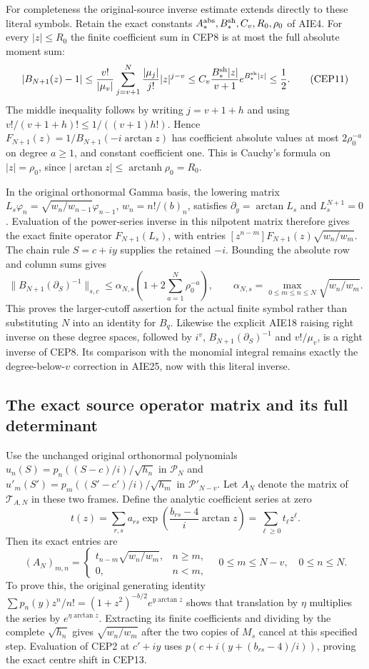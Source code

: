 \documentclass[11pt,a4paper]{article}
\begin{document}
For completeness the original-source inverse estimate extends
directly to these literal symbols. Retain the exact constants
$A_*^{\rm abs},B_*^{\rm sh},C_v,R_0,\rho_0$ of AIE4.
For every $|z|\le R_0$ the finite coefficient sum in CEP8 is at most
the full absolute moment sum:
\[
 |B_{N+1}(z)-1|
 \le \frac{v!}{|\mu_v|}
          \sum_{j=v+1}^N\frac{|\mu_j|}{j!}|z|^{j-v}
 \le C_v\frac{B_*^{\rm sh}|z|}{v+1}e^{B_*^{\rm sh}|z|}
 \le\frac12.
 \tag{CEP11}
\]
The middle inequality follows by writing $j=v+1+h$ and using
$v!/(v+1+h)!\le1/((v+1)h!)$. Hence
$F_{N+1}(z)=1/B_{N+1}(-i\arctan z)$ has coefficient absolute
values at most $2\rho_0^{-a}$ on degree $a\ge1$, and constant
coefficient one. This is Cauchy's formula on $|z|=\rho_0$, since
$|\arctan z|\le\operatorname{arctanh}\rho_0=R_0$.

In the original orthonormal Gamma basis, the lowering matrix
$L_s\varphi_n=\sqrt{w_n/w_{n-1}}\varphi_{n-1}$,
$w_n=n!/(b)_n$, satisfies
$\partial_y=\arctan L_s$ and $L_s^{N+1}=0$.
Evaluation of the power-series inverse in this nilpotent matrix
therefore gives the exact finite operator
$F_{N+1}(L_s)$, with entries
$[z^{n-m}]F_{N+1}(z)\sqrt{w_n/w_m}$.
The chain rule $S=c+iy$ supplies the retained $-i$.
Bounding the absolute row and column sums gives
\[
 \|B_{N+1}(\partial_S)^{-1}\|_{s,c}
 \le \alpha_{N,s}\left(1+2\sum_{a=1}^N\rho_0^{-a}\right),
 \qquad
 \alpha_{N,s}=\max_{0\le m\le n\le N}\sqrt{w_n/w_m}.
 \tag{CEP12}
\]
This proves the larger-cutoff assertion for the actual finite
symbol rather than substituting $N$ into an identity for $B_q$.
Likewise the explicit AIE18 raising right inverse on these degree
spaces, followed by $i^v$, $B_{N+1}(\partial_S)^{-1}$ and
$v!/\mu_v$, is a right inverse of CEP8. Its comparison with the
monomial integral remains exactly the degree-below-$v$ correction
in AIE25, now with this literal inverse.

\subsection{The exact source operator matrix and its full determinant}

Use the unchanged original orthonormal polynomials
$u_n(S)=p_n((S-c)/i)/\sqrt{h_n}$ in $\mathcal P_N$ and
$u'_m(S')=p_m((S'-c')/i)/\sqrt{h_m}$ in $\mathcal P'_{N-v}$.
Let $A_N$ denote the matrix of $\mathcal T_{A,N}$ in these two
frames. Define the analytic coefficient series at zero
\[
 t(z)=\sum_{r,s}a_{rs}
       \exp\left(\frac{b_{rs}-4}{i}\arctan z\right)
       =\sum_{\ell\ge0}t_\ell z^\ell .
 \tag{CEP13}
\]
Then its exact entries are
\[
 (A_N)_{m,n}=
 \begin{cases}
 t_{n-m}\sqrt{w_n/w_m},&n\ge m,\\
 0,&n<m,
 \end{cases}
 \quad
 0\le m\le N-v,\quad0\le n\le N.
 \tag{CEP14}
\]
To prove this, the original generating identity
$\sum p_n(y)z^n/n!=(1+z^2)^{-b/2}e^{y\arctan z}$
shows that translation by $\eta$ multiplies the series by
$e^{\eta\arctan z}$. Extracting its finite coefficients and
dividing by the complete $\sqrt{h_n}$ gives
$\sqrt{w_n/w_m}$ after the two copies of $M_s$ cancel at this
specified step. Evaluation of CEP2 at $c'+iy$ uses
$p(c+i(y+(b_{rs}-4)/i))$, proving the exact centre shift in CEP13.
\end{document}
